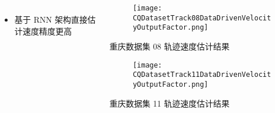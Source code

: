 \begin{frame}
\begin{columns}[t]
\begin{column}{0.6\textwidth}
{\begin{tabular*}{1.1\linewidth}{@{\extracolsep{\fill}}clccccccccccc}
				\end{tabular*}   
		   	}
			\begin{itemize}
				\item 基于 RNN 架构直接估计速度精度更高
			\end{itemize}
		\end{column} 
		\begin{column}{0.4\textwidth}
    		\vspace{-1.4cm}  
		   	\begin{figure}
    			\texttt{[image: CQDatasetTrack08DataDrivenVelocityOutputFactor.png]}
		   	\end{figure}
		   	\vspace{-0.5cm}
		   	\hspace{0.5cm} {\tiny 重庆数据集 08 轨迹速度估计结果}
		   	\vspace{-0.2cm}
		   	\begin{figure}
				\texttt{[image: CQDatasetTrack11DataDrivenVelocityOutputFactor.png]}
		   	\end{figure}
		   	\vspace{-0.5cm}
		   	\hspace{0.5cm} {\tiny 重庆数据集 11 轨迹速度估计结果}
		\end{column}    
	\end{columns}	
 \end{frame}

